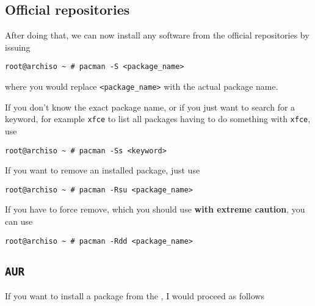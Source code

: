 \documentclass[10pt]{dustdoc}
\begin{document}
\subsection{Official repositories}
\label{sec:official-repositories}
After doing that, we can now install any software from the official repositories by issuing

\begin{verbatim}
root@archiso ~ # pacman -S <package_name>
\end{verbatim}

\noindent
where you would replace \texttt{<package\_name>} with the actual package name.

If you don’t know the exact package name, or if you just want to search for a keyword, for example \texttt{xfce} to list all packages having to do something with \texttt{xfce}, use

\begin{verbatim}
root@archiso ~ # pacman -Ss <keyword>
\end{verbatim}

If you want to remove an installed package, just use

\begin{verbatim}
root@archiso ~ # pacman -Rsu <package_name>
\end{verbatim}

\begin{CAUTION}
    If you have to force remove, which you should use \textbf{with extreme caution}, you can use

    \begin{verbatim}
root@archiso ~ # pacman -Rdd <package_name>
    \end{verbatim}
\end{CAUTION}

\subsection{\texttt{AUR}}
\label{sec:aur}
If you want to install a package from the , I would proceed as follows
\end{document}
